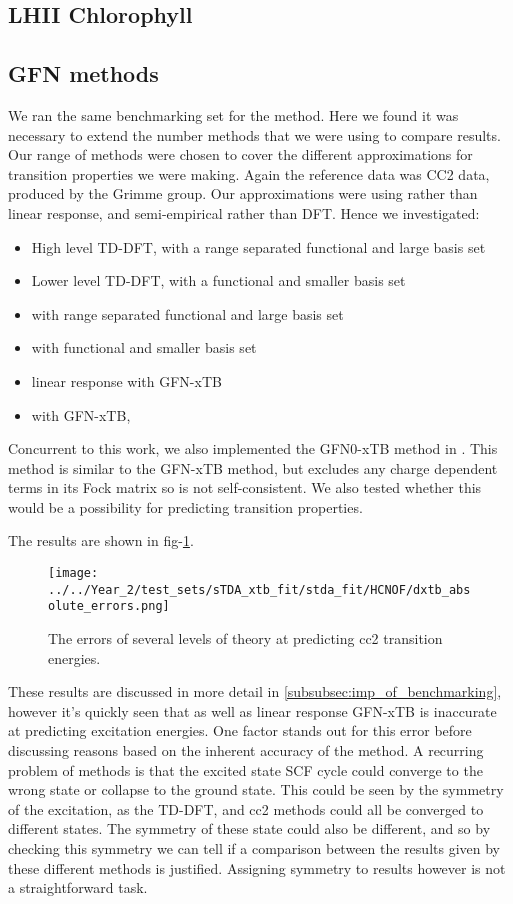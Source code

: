 \subsection{LHII Chlorophyll}
\label{subsec:dscf_chl_tests}

\subsection{GFN methods}
\label{subsec:dscf_gfn_tests}
We ran the same benchmarking set for the \dxtb method. Here we found it was 
necessary to extend the number methods that we were using to compare results.
Our range of methods were chosen to cover the different approximations for
transition properties we were making. Again the reference data was CC2 data, 
produced by the Grimme group. Our approximations were using \dscf rather than
linear response, and semi-empirical rather than DFT. Hence we investigated:
\begin{itemize}
    \item High level TD-DFT, with a range separated functional and large basis set
    \item Lower level TD-DFT, with a functional and smaller basis set
    \item \dscf with range separated functional and large basis set
    \item \dscf with functional and smaller basis set
    \item linear response with GFN-xTB
    \item \dscf with GFN-xTB, \dxtb
\end{itemize}

Concurrent to this work, we also implemented the GFN0-xTB method in .
This method is similar to the GFN-xTB method, but excludes any charge dependent
terms in its Fock matrix so is not self-consistent. We also tested whether this
would be a possibility for predicting transition properties.

The results are shown in fig-\ref{fig:dxtb_absolute_errors}.

\begin{figure}
    \label{fig:dxtb_absolute_errors}
    \texttt{[image: ../../Year\_2/test\_sets/sTDA\_xtb\_fit/stda\_fit/HCNOF/dxtb\_absolute\_errors.png]}
    \caption{The errors of several levels of theory at predicting cc2 transition
    energies.}
\end{figure}

These results are discussed in more detail in \ref{subsubsec:imp_of_benchmarking},
however it's quickly seen that \dxtb as well as linear response GFN-xTB is inaccurate 
at predicting excitation energies.
One factor stands out for this error before discussing reasons based on
the inherent accuracy of the method. A recurring problem of \dscf methods is that
the excited state SCF cycle could converge to the wrong state or collapse to the
ground state. This could be seen by the symmetry of the excitation, as the TD-DFT,
\dscf and cc2 methods could all be converged to different states. The symmetry of
these state could also be different, and so by checking this symmetry we can tell
if a comparison between the results given by these different methods is justified.
Assigning symmetry to \dscf results however is not a straightforward task.

